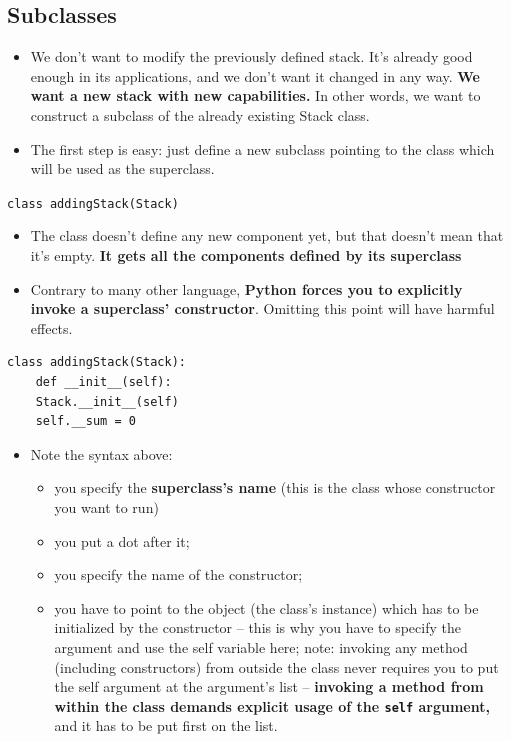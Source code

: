 \documentclass[11pt]{article}
\begin{document}
\subsection{Subclasses}
\label{sec:orgf7fc5c7}
\begin{itemize}
\item We don’t want to modify the previously defined stack. It’s already
good enough in its applications, and we don’t want it changed in any
way. \textbf{We want a new stack with new capabilities.} In other words, we
want to construct a subclass of the already existing Stack class.
\item The first step is easy: just define a new subclass pointing to the
class which will be used as the superclass.
\end{itemize}

\texttt{class addingStack(Stack)}

\begin{itemize}
\item The class doesn’t define any new component yet, but that doesn’t
mean that it’s empty. \textbf{It gets all the components defined by its
superclass}

\item Contrary to many other language, \textbf{Python forces you to explicitly
invoke a superclass’ constructor}. Omitting this point will have
harmful effects.
\end{itemize}

\begin{verbatim}
class addingStack(Stack):
    def __init__(self):
	Stack.__init__(self)
	self.__sum = 0 
\end{verbatim}

\begin{itemize}
\item Note the syntax above:
\begin{itemize}
\item you specify the \textbf{superclass’s name} (this is the class whose
constructor you want to run)
\item you put a dot after it;
\item you specify the name of the constructor;
\item you have to point to the object (the class’s instance) which has
to be initialized by the constructor – this is why you have to
specify the argument and use the self variable here; note:
invoking any method (including constructors) from outside the
class never requires you to put the self argument at the
argument’s list – \textbf{invoking a method from within the class demands
explicit usage of the \texttt{self} argument,} and it has to be put first
on the list.
\end{itemize}
\end{itemize}
\end{document}
